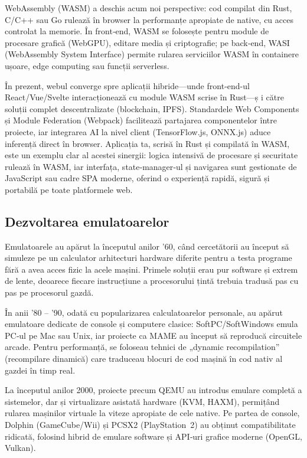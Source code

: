 \documentclass[titlepage,12pt]{article}
\begin{document}
WebAssembly (WASM) a deschis acum noi perspective: cod compilat din Rust, C/C++ sau Go rulează în browser la performanțe apropiate de native, cu acces controlat la memorie. În front‑end, WASM se folosește pentru module de procesare grafică (WebGPU), editare media și criptografie; pe back‑end, WASI (WebAssembly System Interface) permite rularea serviciilor WASM în containere ușoare, edge computing sau funcții serverless.

În prezent, webul converge spre aplicații hibride—unde front‑end-ul React/Vue/Svelte interacționează cu module WASM scrise în Rust—ș i către soluții complet descentralizate (blockchain, IPFS). Standardele Web Components și Module Federation (Webpack) facilitează partajarea componentelor între proiecte, iar integrarea AI la nivel client (TensorFlow.js, ONNX.js) aduce inferență direct în browser. Aplicația ta, scrisă în Rust și compilată în WASM, este un exemplu clar al acestei sinergii: logica intensivă de procesare și securitate rulează în WASM, iar interfața, state‑manager‑ul și navigarea sunt gestionate de JavaScript sau cadre SPA moderne, oferind o experiență rapidă, sigură și portabilă pe toate platformele web.

\subsection{Dezvoltarea emulatoarelor}

Emulatoarele au apărut la începutul anilor ’60, când cercetătorii au început să simuleze pe un calculator arhitecturi hardware diferite pentru a testa programe fără a avea acces fizic la acele mașini. Primele soluții erau pur software și extrem de lente, deoarece fiecare instrucțiune a procesorului țintă trebuia tradusă pas cu pas pe procesorul gazdă.

În anii ’80 – ’90, odată cu popularizarea calculatoarelor personale, au apărut emulatoare dedicate de console și computere clasice: SoftPC/SoftWindows emula PC‑ul pe Mac sau Unix, iar proiecte ca MAME au început să reproducă circuitele arcade. Pentru performanță, se foloseau tehnici de „dynamic recompilation” (recompilare dinamică) care traduceau blocuri de cod mașină în cod nativ al gazdei în timp real.

La începutul anilor 2000, proiecte precum QEMU au introdus emulare completă a sistemelor, dar și virtualizare asistată hardware (KVM, HAXM), permițând rularea mașinilor virtuale la viteze apropiate de cele native. Pe partea de console, Dolphin (GameCube/Wii) și PCSX2 (PlayStation 2) au obținut compatibilitate ridicată, folosind hibrid de emulare software și API‑uri grafice moderne (OpenGL, Vulkan).
\end{document}
